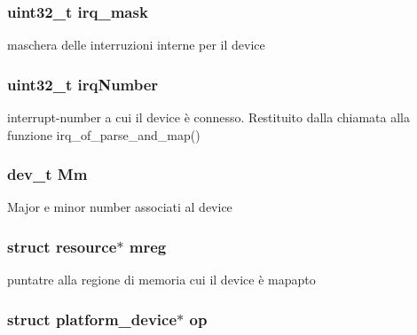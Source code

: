 \hypertarget{structmy_g_p_i_o_k__t_a8ee102d0534084ca58a9cf9b8a3d9cc9}{
\subsubsection[{irq\+\_\+mask}]{\setlength{\rightskip}{0pt plus 5cm}uint32\+\_\+t irq\+\_\+mask}}\label{structmy_g_p_i_o_k__t_a8ee102d0534084ca58a9cf9b8a3d9cc9}
maschera delle interruzioni interne per il device \hypertarget{structmy_g_p_i_o_k__t_a42a1593ebe61611c4e29413903a373a5}{
\subsubsection[{irq\+Number}]{\setlength{\rightskip}{0pt plus 5cm}uint32\+\_\+t irq\+Number}}\label{structmy_g_p_i_o_k__t_a42a1593ebe61611c4e29413903a373a5}
interrupt-\/number a cui il device è connesso. Restituito dalla chiamata alla funzione irq\+\_\+of\+\_\+parse\+\_\+and\+\_\+map() \hypertarget{structmy_g_p_i_o_k__t_aeb60fb4e41b5f11f70ebe969361884f4}{
\subsubsection[{Mm}]{\setlength{\rightskip}{0pt plus 5cm}dev\+\_\+t Mm}}\label{structmy_g_p_i_o_k__t_aeb60fb4e41b5f11f70ebe969361884f4}
Major e minor number associati al device \hypertarget{structmy_g_p_i_o_k__t_a18c4eb95350c67ccb239a8a39c43c09a}{
\subsubsection[{mreg}]{\setlength{\rightskip}{0pt plus 5cm}struct resource$\ast$ mreg}}\label{structmy_g_p_i_o_k__t_a18c4eb95350c67ccb239a8a39c43c09a}
puntatre alla regione di memoria cui il device è mapapto \hypertarget{structmy_g_p_i_o_k__t_a3a7801058bef8fbe4a2cec3c9579cd70}{
\subsubsection[{op}]{\setlength{\rightskip}{0pt plus 5cm}struct platform\+\_\+device$\ast$ op}}\label{structmy_g_p_i_o_k__t_a3a7801058bef8fbe4a2cec3c9579cd70}
